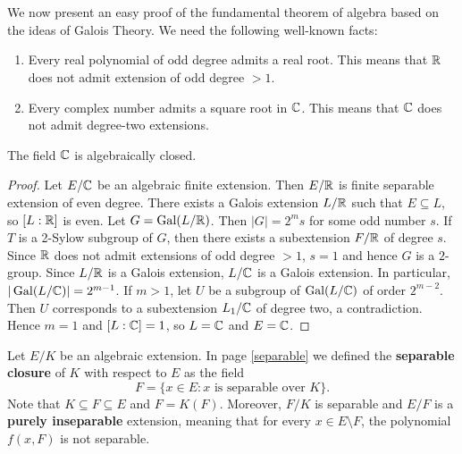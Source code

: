 \chapter{}


We now present an easy proof of the fundamental theorem 
of algebra based on the ideas of Galois Theory. 
We need the following well-known facts:
\begin{enumerate}
\item Every real polynomial of odd degree admits a real root. This means that $\mathbb{R}$ 
does not admit extension of odd degree $>1$. 
\item Every complex number admits a square root in $\mathbb{C}$. This means that $\mathbb{C}$ 
does not admit degree-two extensions.
\end{enumerate}

\begin{theorem}
The field $\mathbb{C}$ is algebraically closed.
\end{theorem}

\begin{proof}
    Let $E/\mathbb{C}$ be an algebraic finite extension. Then $E/\mathbb{R}$ 
    is finite separable extension of even degree. There exists a Galois
    extension 
    $L/\mathbb{R}$ such that $E\subseteq L$, so $[L:\mathbb{R}]$ is even. Let $G=\operatorname{Gal}(L/\mathbb{R})$. 
    Then $|G|=2^ms$ for some odd number $s$. If $T$ is a 2-Sylow subgroup
    of $G$, 
    then there exists a subextension $F/\mathbb{R}$ of degree $s$. Since 
    $\mathbb{R}$ does not admit extensions of odd degree $>1$, $s=1$ and
    hence $G$ is a $2$-group. Since 
    $L/\mathbb{R}$ is a Galois extension, $L/\mathbb{C}$ is a Galois extension. 
    In particular, $|\operatorname{Gal}(L/\mathbb{C})|=2^{m-1}$. If $m>1$, 
    let $U$ be a subgroup of $\operatorname{Gal}(L/\mathbb{C})$ of order $2^{m-2}$. Then $U$ corresponds 
    to a subextension $L_1/\mathbb{C}$ of degree two, a contradiction. Hence $m=1$ 
    and $[L:\mathbb{C}]=1$, so $L=\mathbb{C}$ and $E=\mathbb{C}$. 
\end{proof}


Let $E/K$ be an algebraic extension. 
In page \ref{separable} we defined the 
\textbf{separable closure} of $K$ with respect to $E$ as 
the field 
\[
    F=\{x\in E:x\text{ is separable over }K\}.
\]
Note that $K\subseteq F\subseteq E$ 
and $F=K(F)$. Moreover, 
$F/K$ is separable and 
$E/F$ is a \textbf{purely inseparable} extension, meaning that
for every $x\in E\setminus F$, the polynomial $f(x,F)$ is not separable. 

